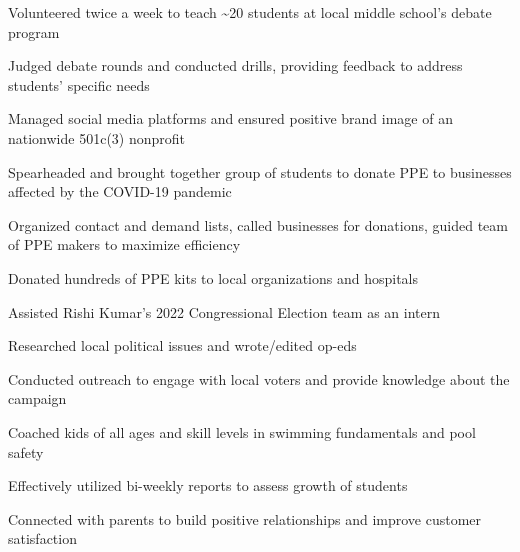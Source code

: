 \documentclass[letterpaper]{resume-shreeram}
\begin{document}
\begin{compactitem}
    \item Volunteered twice a week to teach \textasciitilde{}20 students
      at local middle school's debate program

    \item Judged debate rounds and conducted drills, providing feedback
      to address students' specific needs
\end{compactitem}

\begin{compactitem}
    \item Managed social media platforms and ensured positive brand
      image of an nationwide 501c(3) nonprofit
\end{compactitem}

\begin{compactitem}
    \item Spearheaded and brought together group of students to donate PPE
      to businesses affected by the COVID-19 pandemic

    \item Organized contact and demand lists, called businesses for
      donations, guided team of PPE makers to maximize efficiency

    \item Donated hundreds of PPE kits to local organizations and
      hospitals
\end{compactitem}

\begin{compactitem}
    \item Assisted Rishi Kumar's 2022 Congressional Election team as an
      intern

    \item Researched local political issues and wrote/edited op-eds

    \item Conducted outreach to engage with local voters and provide
      knowledge about the campaign
\end{compactitem}

\begin{compactitem}
    \item Coached kids of all ages and skill levels in swimming
      fundamentals and pool safety

    \item Effectively utilized bi-weekly reports to assess growth of
      students

    \item Connected with parents to build positive relationships and
      improve customer satisfaction
\end{compactitem}
\end{document}
